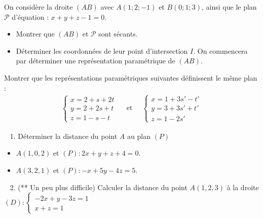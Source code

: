 \documentclass[letterpaper,10pt,english]{jupyterBook}
\begin{document}
\sphinxAtStartPar
{} On considère la droite \((AB)\) avec \(A(1;2;-1)\) et \(B(0;1;3)\), ainsi que le plan \(\mathcal{P}\) d’équation : \(x+y+z-1=0\).
\begin{itemize}
\item {} 
\sphinxAtStartPar
Montrer que \((AB)\) et \(\mathcal{P}\) sont sécants.

\item {} 
\sphinxAtStartPar
Déterminer les coordonnées de leur point d’intersection \(I\). On commencera par déterminer une représentation paramétrique de \((AB)\).

\end{itemize}

\sphinxAtStartPar
{} Montrer que les représentations paramétriques suivantes
définissent le même plan :
\begin{equation*}
\begin{split}
\left\{ \begin{array}{l}x=2+s+2t \\ y=2+2s+t \\ z=1-s-t \end{array} \right.
\quad \text{ et } \quad  \left\{ \begin{array}{l} x=1+3s'-t'\\ y=3+3s'+t'\\ z=1-2s' \end{array} \right.
\end{split}
\end{equation*}
\sphinxAtStartPar
{}

\sphinxAtStartPar
  1. Déterminer la distance du point \(A\) au plan \((P)\)
\begin{itemize}
\item {} 
\sphinxAtStartPar
\(A(1,0,2)\) et \((P): 2x+y+z+4=0\).

\item {} 
\sphinxAtStartPar
\(A(3,2,1)\) et \((P): -x+5y-4z=5\).

\end{itemize}

\sphinxAtStartPar
  2. (** Un peu plus difficile) Calculer la distance du point \(A(1,2,3)\) à la droite
\((D):  \left\{ \begin{array}{l}
-2x+y-3z=1\\ x+z=1  \end{array} \right.\)







\renewcommand{\indexname}{Index}
\printindex
\end{document}
